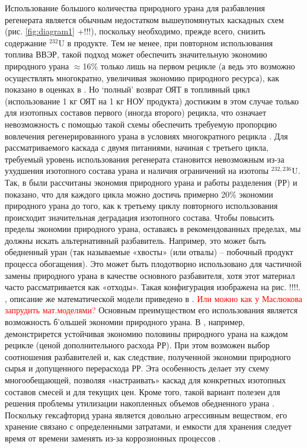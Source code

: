 Использование большого количества природного урана для разбавления регенерата является обычным недостатком вышеупомянутых каскадных схем (рис. \ref{fig:diagram1} +!!!), поскольку необходимо, прежде всего, снизить содержание $^{232}$U в продукте. Тем не менее, при повторном использования топлива ВВЭР, такой подход может обеспечить значительную экономию природного урана $\approx$16\% только лишь на первом рецикле (а ведь это возможно осуществлять многократно, увеличивая экономию природного ресурса), как показано в оценках в \cite{smirnovEvolutionIsotopicComposition2012}. Но `полный' возврат ОЯТ в топливный цикл (использование 1 кг ОЯТ на 1 кг НОУ продукта) достижим в этом случае только для изотопных составов первого (иногда второго) рецикла, что означает невозможность с помощью такой схемы обеспечить требуемую пропорцию вовлечения регенерированного урана в условиях многократного рецикла \cite{smirnovApplyingEnrichmentCapacities2018}.
Для рассматриваемого каскада с двумя питаниями, начиная с третьего цикла, требуемый уровень использования регенерата становится невозможным из-за ухудшения изотопного состава урана и наличия ограничений на изотопы $^{232,236}$U.
Так, в \cite{smirnovApplyingEnrichmentCapacities2018} были рассчитаны экономия природного урана и работы разделения (РР) и показано, что для каждого цикла можно достичь примерно 20\% экономии природного урана до того, как к третьему циклу повторного использования происходит значительная деградация изотопного состава.
Чтобы повысить пределы экономии природного урана, оставаясь в рекомендованных пределах, мы должны искать альтернативный разбавитель. Например, это может быть обедненный уран (так называемые «хвосты» (или отвалы) -- побочный продукт процесса обогащения). Это может быть плодотворно использовано для частичной замены природного урана в качестве основного разбавителя, хотя этот материал часто рассматривается как «отходы». Такая конфигурация изображена на рис. !!!!. , описание же математической модели приведено в \cite{smirnovEnrichmentRegeneratedUranium2014}.
\textcolor{red}{Или можно как у Маслюкова запрудить мат.моделями?}
Основным преимуществом его использования является возможность б'ольшей экономии природного урана. В \cite{smirnovApplyingEnrichmentCapacities2018}, например, демонстрирется устойчивая экономию половины природного урана на каждом рецикле (ценой дополнительного расхода РР). При этом возможен выбор соотношения разбавителей и, как следствие, полученной экономии природного сырья и допущенного перерасхода РР. Эта особенность делает эту схему многообещающей, позволяя «настраивать» каскад для конкретных изотопных составов смесей и для текущих цен. Кроме того, такой вариант полезен для решения проблемы утилизации накопленных объемов обедненного урана \cite{smirnovEnrichmentRegeneratedUranium2014}. Поскольку гексафторид урана является довольно агрессивным веществом, его хранение связано с определенными затратами, и емкости для хранения следует время от времени заменять из-за коррозионных процессов \cite{fitchOPTIONSDISPOSALREAPPLICATION2009, oecdManagementDepletedUranium2001}.
